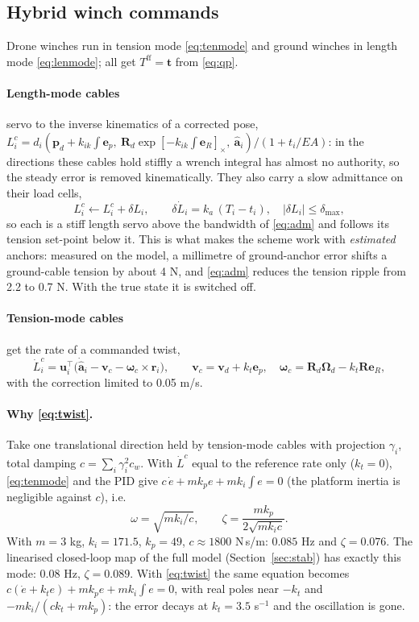 \documentclass[11pt,a4paper]{article}
\newcommand{\hatm}[1]{[#1]_\times}
\newcommand{\T}{^{\!\top}}
\newcommand{\e}{\bm{e}}
\begin{document}
\subsection{Hybrid winch commands}\label{sec:hybrid}
Drone winches run in tension mode \eqref{eq:tenmode} and ground winches in length mode \eqref{eq:lenmode}; all
get $T^{\mathrm{ff}}=\bm t$ from \eqref{eq:qp}.
\paragraph{Length-mode cables} servo to the inverse kinematics of a corrected pose,
$L^c_i=d_i(\bm p_d+k_{ik}\!\int\!\e_p,\ \bm R_d\exp\hatm{-k_{ik}\!\int\!\e_R},\ \hat{\bm a}_i)/(1+t_i/EA)$: in the
directions these cables hold stiffly a wrench integral has almost no authority, so the steady error is removed
kinematically.
They also carry a slow admittance on their load cells,
\begin{equation}
 L^c_i\leftarrow L^c_i+\delta L_i,\qquad \delta\dot L_i=k_a\,(T_i-t_i),\quad|\delta L_i|\le\delta_{\max},
 \label{eq:adm}
\end{equation}
so each is a stiff length servo above the bandwidth of \eqref{eq:adm} and follows its tension set-point below it.
This is what makes the scheme work with \emph{estimated} anchors: measured on the model, a millimetre of
ground-anchor error shifts a ground-cable tension by about 4 N, and \eqref{eq:adm} reduces the tension ripple from
2.2 to 0.7 N. With the true state it is switched off.
\paragraph{Tension-mode cables} get the rate of a commanded twist,
\begin{equation}
 \dot L^c_i=\bm u_i\T\bigl(\dot{\hat{\bm a}}_i-\bm v_c-\bm\omega_c\times\bm r_i\bigr),\qquad \bm v_c=\bm v_d+k_t\e_p,\quad\bm\omega_c=\bm R_d\bm\Omega_d-k_t\bm R\e_R,
 \label{eq:twist}
\end{equation}
with the correction limited to 0.05 m/s.
\paragraph{Why \eqref{eq:twist}.} Take one translational direction held by tension-mode cables with projection
$\gamma_i$, total damping $c=\sum_i\gamma_i^2c_w$. With $\dot L^c$ equal to the reference rate only
($k_t=0$), \eqref{eq:tenmode} and the PID give $c\,\dot e+mk_pe+mk_i\!\int\!e=0$ (the platform inertia is
negligible against $c$), i.e.
\begin{equation}
 \omega=\sqrt{mk_i/c},\qquad\zeta=\frac{mk_p}{2\sqrt{mk_ic}} .
\end{equation}
With $m=3$ kg, $k_i=171.5$, $k_p=49$, $c\approx1800$ N\,s/m: $0.085$ Hz and $\zeta=0.076$. The linearised
closed-loop map of the full model (Section~\ref{sec:stab}) has exactly this mode: 0.08 Hz, $\zeta=0.089$. With
\eqref{eq:twist} the same equation becomes $c(\dot e+k_te)+mk_pe+mk_i\!\int\!e=0$, with real poles near
$-k_t$ and $-mk_i/(ck_t+mk_p)$: the error decays at $k_t=3.5$ s$^{-1}$ and the oscillation is gone.
\end{document}
